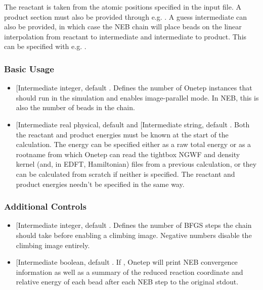 \documentclass[letterpaper,10pt,english]{sphinxmanual}
\begin{document}
The reactant is taken from the atomic positions specified in the input
file. A product section must also be provided through e.g.
. A guess intermediate can also be
provided, in which case the NEB chain will place beads on the linear
interpolation from reactant to intermediate and intermediate to product.
This can be specified with e.g. .


\subsubsection{Basic Usage}
\label{\detokenize{nudged-elastic-band:basic-usage}}\begin{itemize}
\item {} 
 {[}Intermediate integer, default \sphinxcode{1}{]}. Defines the
number of Onetep instances that should run in the simulation and
enables image-parallel mode. In NEB, this is also the number of beads
in the chain.

\item {} 
 {[}Intermediate real physical, default
\sphinxcode{N/A}{]} and  {[}Intermediate string,
default \sphinxcode{NONE}{]}. Both the reactant and product energies must be
known at the start of the calculation. The energy can be specified
either as a raw total energy or as a rootname from which Onetep can
read the tightbox NGWF and density kernel (and, in EDFT, Hamiltonian)
files from a previous calculation, or they can be calculated from
scratch if neither is specified. The reactant and product energies
needn’t be specified in the same way.

\end{itemize}


\subsubsection{Additional Controls}
\label{\detokenize{nudged-elastic-band:additional-controls}}\begin{itemize}
\item {} 
 {[}Intermediate integer, default \sphinxcode{-1}{]}. Defines
the number of BFGS steps the chain should take before enabling a
climbing image. Negative numbers disable the climbing image entirely.

\item {} 
 {[}Intermediate boolean, default \sphinxcode{.true.}{]}. If
, Onetep will print NEB convergence information as well as
a summary of the reduced reaction coordinate and relative energy of
each bead after each NEB step to the original stdout.

\end{itemize}
\end{document}
